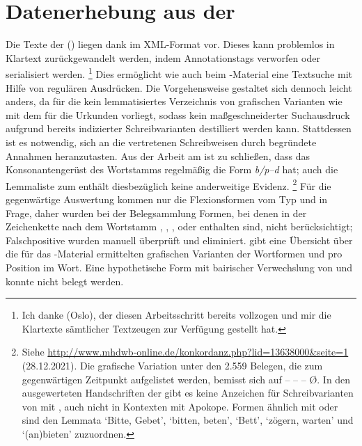 
\section{Datenerhebung aus der }

Die Texte der  (\KC) liegen dank 
\autocite{kcdigital} im XML-Format vor. Dieses kann problemlos in Klartext
zurückgewandelt werden, indem Annotationstags verworfen oder serialisiert
werden.%
%
	\footnote{Ich danke  (Oslo), der diesen
	Arbeitsschritt bereits vollzogen und mir die Klartexte sämtlicher
	Textzeugen zur Verfügung gestellt hat.}
%
Dies ermöglicht wie auch beim \CAO{}-Material eine Textsuche mit Hilfe von
regulären Ausdrücken. Die Vorgehensweise gestaltet sich dennoch leicht anders,
da für die \KC{} kein lemmatisiertes Verzeichnis von grafischen Varianten wie
mit dem \WMU{} für die Urkunden vorliegt, sodass kein maßgeschneiderter
Suchausdruck aufgrund bereits indizierter Schreibvarianten destilliert werden
kann. Stattdessen ist es notwendig, sich an die vertretenen Schreibweisen durch
begründete Annahmen heranzutasten. Aus der Arbeit am \CAO{} ist zu schließen,
dass das Konsonantengerüst des Wortstamms regelmäßig die Form \textit{b/p--d}
hat; auch die Lemmaliste zum 
\autocite[s.\,v.~]{mwb1} enthält diesbezüglich keine anderweitige
Evidenz.%
%
	\footnote{Siehe
		\url{http://www.mhdwb-online.de/konkordanz.php?lid=13638000&seite=1}
		(28.12.2021). Die grafische Variation unter den 2.559 Belegen, die zum
		gegenwärtigen Zeitpunkt aufgelistet werden, bemisst sich auf 
		--  --  --  Ø. In den
		ausgewerteten Handschriften der \KC{} gibt es keine Anzeichen für
		Schreibvarianten von  mit , auch nicht in
		Kontexten mit Apokope. Formen ähnlich  mit  oder
		 sind den Lemmata  `Bitte, Gebet',
		 `bitten, beten',  `Bett',
		 `zögern, warten' und  `(an)bieten'
		zuzuordnen.}
%
Für die gegenwärtige Auswertung kommen nur die Flexionsformen vom Typ 
und  in Frage, daher wurden bei der Belegsammlung Formen, bei denen
in der Zeichenkette nach dem Wortstamm , , , 
oder  enthalten sind, nicht berücksichtigt; Falschpositive wurden
manuell überprüft und eliminiert.  gibt eine Übersicht
über die für das \KC{}-Material ermittelten grafischen Varianten der Wortformen
 und  pro Position im Wort. Eine hypothetische Form
 mit bairischer Verwechslung von  und 
\autocite[153]{paul2007} konnte nicht belegt werden.

